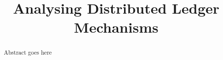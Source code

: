 \documentclass[conference]{llncs}
\begin{document}

\title{Analysing Distributed Ledger Mechanisms}



\maketitle


\begin{abstract}
Abstract goes here
\end{abstract}







   

    







\end{document}
